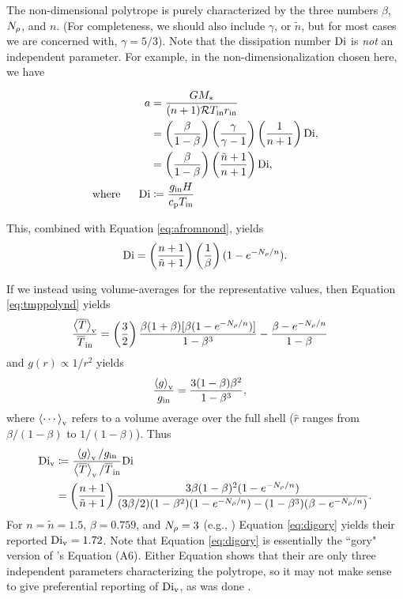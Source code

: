 \documentclass[12pt]{article}
\numberwithin{equation}{section}
\begin{document}
The non-dimensional polytrope is purely characterized by the three numbers $\beta$, $N_\rho$, and $n$. (For completeness, we should also include $\gamma$, or $\tilde{n}$, but for most cases we are concerned with, $\gamma=5/3$). Note that the dissipation number ${\rm{Di}}$ is \textit{not} an independent parameter. For example, in the non-dimensionalization chosen here, we have

\begin{align*}
	a &= \frac{GM_*}{(n+1)\mathcal{R} T_{\rm{in}} r_{\rm{in}}} \\
	&= \left(\frac{\beta}{1-\beta}\right) \left(\frac{\gamma}{\gamma - 1}\right)  \left( \frac{1}{n+1} \right) {\rm{Di}},\\
	&= \left(\frac{\beta}{1-\beta}\right) \left( \frac{\tilde{n}+1}{n+1} \right) {\rm{Di}}, \\
	\text{where}\ \ \ \ \  {\rm{Di}} &\coloneqq \frac{g_{\rm{in}} H}{c_{\rm{p}} T_{\rm{in}}}
\end{align*}

This, combined with Equation \eqref{eq:afromnond}, yields
\begin{align}
	{\rm{Di}} = \left(\frac{n+1}{\tilde{n}+1}\right)  \left(\frac{1}{\beta} \right) (1 - e^{-N_\rho/n}).
\end{align}

If we instead using volume-averages for the representative values, then Equation \eqref{eq:tmppolynd} yields
\begin{align*}
	\frac{\left\langle\overline{T}\right\rangle_{\rm{v}}}{\overline{T}_{\rm{in}}} &= \left(\frac{3}{2}\right) \frac{\beta(1+\beta)[\beta(1-e^{-N_\rho/n})]} {1-\beta^3} - \frac{\beta-e^{-N_\rho/n}}{1-\beta}
\end{align*}
and $g(r)\propto 1/r^2$ yields
\begin{align*}
	\frac{\left\langle g\right\rangle_{\rm{v}}}{g_{\rm{in}}} &= \frac{3(1-\beta)\beta^2}{1-\beta^3},
\end{align*}
where $\left\langle\cdots\right\rangle_{\rm{v}}$ refers to a volume average over the full shell ($\hat{r}$ ranges from $\beta/(1-\beta)$ to $1/(1-\beta)$). Thus
\begin{align}\label{eq:digory}
	{\rm{Di}}_{\rm{v}} &\coloneqq \frac{\left\langle g\right\rangle_{\rm{v}}/g_{\rm{in}}}{\left\langle\overline{T}\right\rangle_{\rm{v}}/\overline{T}_{\rm{in}}}{\rm{Di}} \nonumber\\
	&= \left(\frac{n+1}{\tilde{n}+1}\right)   \frac{3 \beta (1 - \beta)^2 (1 - e^{-N_\rho/n})} 
	 { (3\beta/2) (1 - \beta^2) (1 - e^{-N_\rho/n}) - (1-\beta^3)(\beta-e^{-N_\rho/n})}. 
\end{align}
For $n=\tilde{n}=1.5$, $\beta=0.759$, and $N_\rho=3$ (e.g., \citealt{Hindman2020, Matilsky2022}) Equation \eqref{eq:digory} yields their reported ${\rm{Di}}_{\rm{v}}=1.72$. Note that Equation \eqref{eq:digory} is essentially the ``gory" version of \citealt{Hindman2020}'s Equation (A6). Either Equation shows that their are only three independent parameters characterizing the polytrope, so it may not make sense to give preferential reporting of ${\rm{Di}}_{\rm{v}}$, as was done \citet{Hindman2020,Matilsky2022}. 
\end{document}
